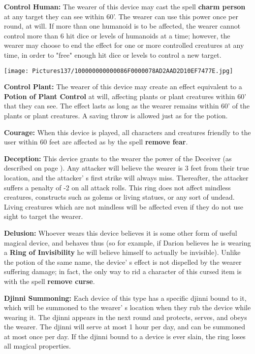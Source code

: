 \documentclass[a4paper,twoside,openany,10pt]{book}
\begin{document}
\begin{multicols}{2}
\textbf{Control Human:} The wearer of this device may cast the spell \textbf{charm person} at any target they can see within 60'. The wearer can use this power once per round, at will. If more than one humanoid is to be affected, the wearer cannot control more than 6 hit dice or levels of humanoids at a time; however, the wearer may choose to end the effect for one or more controlled creatures at any time, in order to "free" enough hit dice or levels to control a new target.

\begin{center}
	\texttt{[image: Pictures137/100000000000086F0000078AD2AAD2D10EF7477E.jpg]}
\end{center}

\textbf{Control Plant:} The wearer of this device may create an effect equivalent to a \textbf{Potion of Plant Control} at will, affecting plants or plant creatures within 60' that they can see. The effect lasts as long as the wearer remains within 60' of the plants or plant creatures. A saving throw is allowed just as for the potion.

\textbf{Courage: }When this device is played, all characters and creatures friendly to the user within 60 feet are affected as by the spell \textbf{remove fear}.

\textbf{Deception:} This device grants to the wearer the power of the Deceiver (as described on page \hyperlink{deceiver-panther-hydra}{\pageref{deceiver-panther-hydra}}). Any attacker will believe the wearer is 3 feet from their true location, and the attacker' s first strike will always miss. Thereafter, the attacker suffers a penalty of -2 on all attack rolls. This ring does not affect mindless creatures, constructs such as golems or living statues, or any sort of undead. Living creatures which are not mindless will be affected even if they do not use sight to target the wearer.

\textbf{Delusion:} Whoever wears this device believes it is some other form of useful magical device, and behaves thus (so for example, if Darion believes he is wearing a \textbf{Ring of Invisibility} he will believe himself to actually be invisible). Unlike the potion of the same name, the device' s effect is not dispelled by the wearer suffering damage; in fact, the only way to rid a character of this cursed item is with the spell \textbf{remove curse}.

\textbf{Djinni Summoning:} Each device of this type has a specific djinni bound to it, which will be summoned to the wearer' s location when they rub the device while wearing it. The djinni appears in the next round and protects, serves, and obeys the wearer. The djinni will serve at most 1 hour per day, and can be summoned at most once per day. If the djinni bound to a device is ever slain, the ring loses all magical properties.


\end{multicols}
\end{document}
